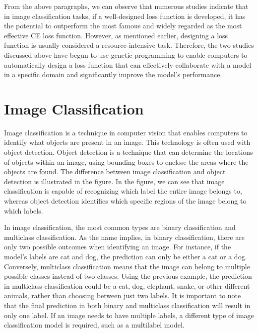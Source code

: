 \begin{ZhChapter}
    From the above paragraphs, we can observe that numerous studies indicate that in image classification tasks, if a well-designed loss function is developed, it has the potential to outperform the most famous and widely regarded as the most effective CE loss function. However, as mentioned earlier, designing a loss function is usually considered a resource-intensive task. Therefore, the two studies discussed above have begun to use genetic programming to enable computers to automatically design a loss function that can effectively collaborate with a model in a specific domain and significantly improve the model's performance.

    \section{Image Classification}
    Image classification is a technique in computer vision that enables computers to identify what objects are present in an image. This technology is often used  with object detection. Object detection is a technique that can determine the locations of objects within an image, using bounding boxes to enclose the areas where the objects are found. The difference between image classification and object detection is illustrated in the figure. In the figure, we can see that image classification is capable of recognizing which label the entire image belongs to, whereas object detection identifies which specific regions of the image belong to which labels.

    In image classification, the most common types are binary classification and multiclass classification. As the name implies, in binary classification, there are only two possible outcomes when identifying an image. For instance, if the model's labels are cat and dog, the prediction can only be either a cat or a dog. Conversely, multiclass classification means that the image can belong to multiple possible classes instead of two classes. Using the previous example, the prediction in multiclass classification could be a cat, dog, elephant, snake, or other different animals, rather than choosing between just two labels. It is important to note that the final prediction in both binary and multiclass classification will result in only one label. If an image needs to have multiple labels, a different type of image classification model is required, such as a multilabel model.


\end{ZhChapter}
